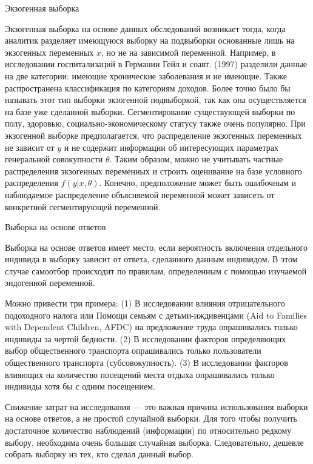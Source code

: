 \begin{center}
Экзогенная выборка
\end{center}


Экзогенная выборка на основе данных обследований возникает тогда, когда аналитик разделяет имеющуюся выборку на подвыборки основанные лишь на  экзогенных переменных $x$, но не на зависимой переменной. Например, в исследовании госпитализаций в Германии Гейл и соавт. (1997) разделили данные на две категории: имеющие хронические заболевания и не имеющие. 
Также распространена классификация по категориям доходов. 
Более точно было бы называть этот тип выборки экзогенной подвыборкой, так как она осуществляется на базе уже сделанной выборки.
Сегментирование существующей выборки по полу, здоровью, социально-экономическому статусу также очень популярно. 
При экзогенной выборке предполагается, что распределение  экзогенных переменных не зависит от $y$ и не содержит информации об интересующих параметрах генеральной совокупности $\theta$. Таким образом, можно не учитывать частные распределения экзогенных переменных и строить оценивание на базе условного распределения $f(y|x,\theta)$. Конечно, предположение может быть ошибочным и наблюдаемое распределение объясняемой переменной может зависеть от конкретной сегментирующей переменной. 


\begin{center}
Выборка на основе ответов
\end{center}

Выборка на основе ответов имеет место, если вероятность включения отдельного индивида в выборку зависит от ответа,  сделанного данным индивидом. В этом случае самоотбор происходит по правилам, определенным с помощью изучаемой эндогенной переменной.


Можно привести три примера: (1) В исследовании влияния отрицательного подоходного налога или Помощи семьям с детьми-иждивенцами (Aid to Families with Dependent Children, AFDC) на предложение труда опрашивались только индивиды за чертой бедности. (2) В исследовании факторов  определяющих выбор общественного транспорта опрашивались только пользователи  общественного транспорта (субсовокупность). (3) В исследовании факторов влияющих на количество посещений места отдыха опрашивались только индивиды хотя бы с одним посещением.


Снижение затрат на исследования --- это важная причина использования выборки на основе ответов, а не  простой случайной выборки. Для того чтобы получить достаточное количество наблюдений (информации) по относительно редкому выбору,  необходима очень большая случайная выборка. Следовательно, дешевле собрать выборку из тех, кто сделал данный выбор.


